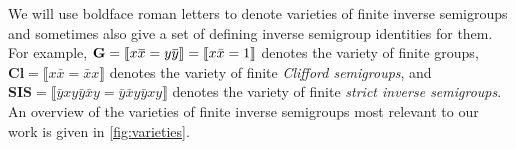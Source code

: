 \documentclass[anonymous,letter,UKenglish,cleveref,autoref,thm-restate]{lipics-v2021}
\newcommand{\vT}{\ensuremath{\mathbf{T}}}
\newcommand{\vG}{\ensuremath{\mathbf{G}}}
\newcommand{\vSl}{\ensuremath{\mathbf{Sl}}}
\newcommand{\vCl}{\ensuremath{\mathbf{Cl}}}
\newcommand{\vSI}{\ensuremath{\mathbf{SIS}}}
\newcommand{\vBS}{\ensuremath{\mathbf{BS}}}  \newcommand{\vBM}{\ensuremath{\mathbf{BM}}}
\newcommand{\vId}[1]{\ensuremath{\llbracket #1 \rrbracket}}
\newcommand\nindent{.5pt}
\newcommand\noverline[1]{\kern\nindent\overline{\kern-\nindent#1\kern-\nindent}\kern\nindent}
\newcommand{\ov}[1]{\noverline{#1}}
\theoremstyle{plain}
\theoremstyle{plain}
\begin{document}
We will use boldface roman letters to denote varieties of finite inverse semigroups and sometimes also give a set of defining inverse semigroup identities for them.
For example, $\vG = \vId{x\ov x = y \ov y} =  \vId{x \bar x = 1}$ denotes the variety of finite groups, $\vCl = \vId{x \bar x = \bar x x}$ denotes the variety of finite \emph{Clifford semigroups}, and $\vSI = \vId{\bar y x y \bar y \bar x y = \bar y \bar x y \bar y x y}$ denotes the variety of finite \emph{strict inverse semigroups}.
An overview of the varieties of finite inverse semigroups most relevant to our work is given in \cref{fig:varieties}.

\begin{figure}[ht]
\begin{minipage}{.37\textwidth}
\end{minipage}
\end{figure}
\end{document}
